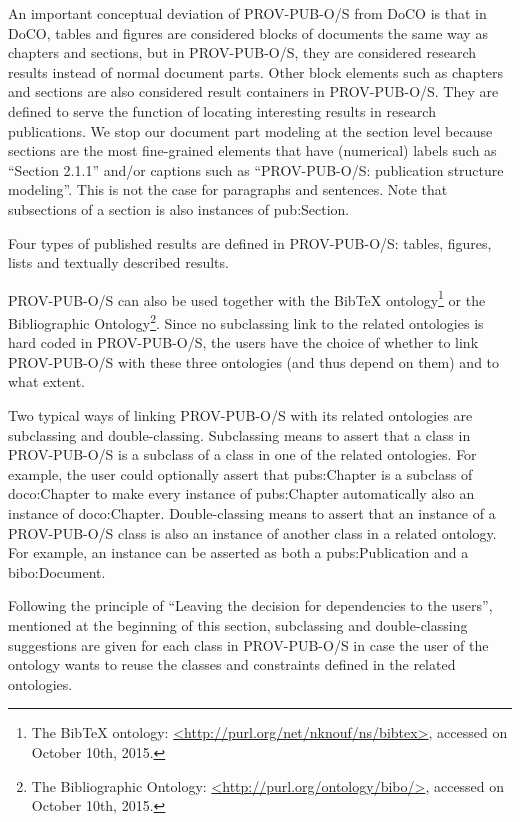 An important conceptual deviation of PROV-PUB-O/S from DoCO is that in DoCO, tables and figures are considered blocks of documents the same way as chapters and sections, but in PROV-PUB-O/S, they are considered research results instead of normal document parts. Other block elements such as chapters and sections are also considered result containers in PROV-PUB-O/S. They are defined to serve the function of locating interesting results in research publications. We stop our document part modeling at the section level because sections are the most fine-grained elements that have (numerical) labels such as ``Section 2.1.1'' and/or captions such as ``PROV-PUB-O/S: publication structure modeling''. This is not the case for paragraphs and sentences. Note that subsections of a section is also instances of pub:Section. 

Four types of published results are defined in PROV-PUB-O/S: tables, figures, lists and textually described results. 

PROV-PUB-O/S can also be used together with the BibTeX ontology\footnote{The BibTeX ontology: \url{<http://purl.org/net/nknouf/ns/bibtex>}, accessed on October 10th, 2015.} or the Bibliographic Ontology\footnote{The Bibliographic Ontology: \url{<http://purl.org/ontology/bibo/>}, accessed on October 10th, 2015.}. Since no subclassing link to the related ontologies is hard coded in PROV-PUB-O/S, the users have the choice of whether 
to link PROV-PUB-O/S with these three ontologies (and thus depend on them) and to what extent. 

Two typical ways of linking PROV-PUB-O/S with its related ontologies are subclassing and double-classing. Subclassing means to assert that a class in PROV-PUB-O/S is a subclass of 
a class in one of the related ontologies. For example, the user could optionally assert that pubs:Chapter is a subclass of 
doco:Chapter to make every instance of pubs:Chapter automatically also an instance of doco:Chapter. Double-classing means to assert that an instance of 
a PROV-PUB-O/S class is also an instance of another class in a related ontology. For example, an instance can be asserted as both a pubs:Publication 
and a bibo:Document.

Following the principle of ``Leaving the decision for dependencies to the users'', mentioned at the beginning of this section, subclassing and double-classing suggestions are given for each class in PROV-PUB-O/S 
in case the user of the ontology 
wants to reuse the classes and constraints defined in the related ontologies.

